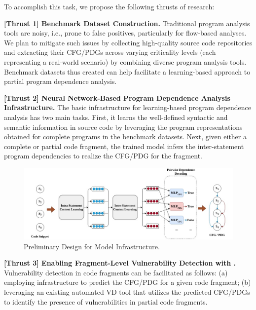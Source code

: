 To accomplish this task, we propose the following thrusts of research:

\vspace{3pt}
\noindent \textbf{[Thrust 1] Benchmark Dataset Construction.} Traditional program analysis tools are noisy, i.e., prone to false positives, particularly for flow-based analyses. We plan to mitigate such issues by collecting high-quality source code repositories and extracting their CFG/PDGs across varying criticality levels (each representing a real-world scenario) by combining diverse program analysis tools. Benchmark datasets thus created can help facilitate a learning-based approach to partial program dependence analysis.

\vspace{3pt}
\noindent \textbf{[Thrust 2] Neural Network-Based Program Dependence Analysis Infrastructure.} The basic infrastructure for learning-based program dependence analysis has two main tasks. First, it learns the well-defined syntactic and semantic information in source code by leveraging the program representations obtained for complete programs in the benchmark datasets. Next, given either a complete or partial code fragment, the trained model infers the inter-statement program dependencies to realize the CFG/PDG for the fragment.

\begin{figure}[ht]
\begin{center}
    \includegraphics[width=\textwidth]{model-abstract.jpg}
    \caption{Preliminary Design for \tool Model Infrastructure.}
    \label{fig:model}
\end{center}
\end{figure}

\vspace{3pt}
\noindent \textbf{[Thrust 3] Enabling Fragment-Level Vulnerability Detection with \tool.} Vulnerability detection in code fragments can be facilitated as follows: (a) employing \tool infrastructure to predict the CFG/PDG for a given code fragment; (b) leveraging an existing automated VD tool that utilizes the predicted CFG/PDGs to identify the presence of vulnerabilities in partial code fragments.
